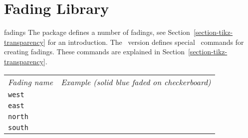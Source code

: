 %
%
%


\section{Fading Library}
\label{section-library-fadings}

\begin{pgflibrary}{fadings}
  The package defines a number of fadings, see
  Section~\ref{section-tikz-transparency} for an introduction.  The
  \tikzname\ version defines special \tikzname\ commands for creating
  fadings. These commands are explained in
  Section~\ref{section-tikz-transparency}.   
\end{pgflibrary}

\newcommand\fadingindex[1]{%
  \index{#1@\protect\texttt{#1} fading}%
  \index{Fadings!#1@\protect\texttt{#1}}%
  \texttt{#1}& 
  \begin{tikzpicture}[baseline=5mm-.5ex]
    \fill [black!20] (0,0) rectangle (1,1);
    \path [pattern=checkerboard,pattern color=black!30] (0,0) rectangle (1,1);

    \fill [fading=#1,blue] (0,0) rectangle (1,1);
  \end{tikzpicture} \\[4.5mm]
}

\noindent
\begin{tabular}{ll}
  \emph{Fading name} & \emph{Example (solid blue faded on checkerboard)} \\[1mm]
  \fadingindex{west}  
  \fadingindex{east}  
  \fadingindex{north}  
  \fadingindex{south} 
\end{tabular}


